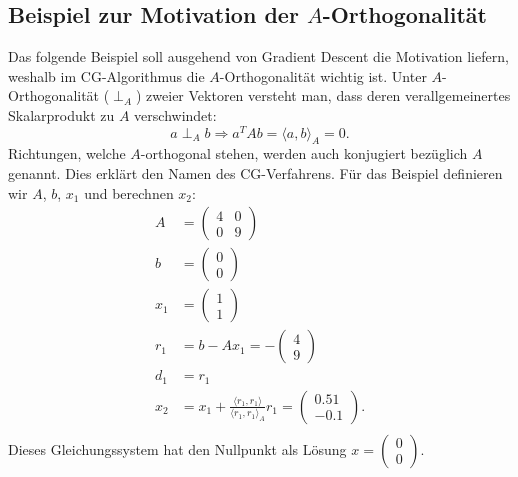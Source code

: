 \subsection{Beispiel zur Motivation der $A$-Orthogonalität} \label{cg:subsec:aortho}
%
Das folgende Beispiel soll ausgehend von Gradient Descent die Motivation liefern, weshalb im CG-Algorithmus die $A$-Orthogonalität wichtig ist.
Unter $A$-Orthogonalität ($\perp_A$) zweier Vektoren versteht man, dass deren verallgemeinertes Skalarprodukt zu $A$ verschwindet:
\begin{equation}
	a \perp_A b \Longrightarrow a^T A b = \langle a , b \rangle_A = 0.
\end{equation}
Richtungen, welche $A$-orthogonal stehen, werden auch konjugiert bezüglich $A$ genannt.
%
Dies erklärt den Namen des CG-Verfahrens.
Für das Beispiel definieren wir $A$, $b$, $x_1$ und berechnen $x_2$:
\begin{align}\nonumber
	A 	&= 		\begin{pmatrix}
				4 & 0\\
				0 & 9 
				\end{pmatrix} \nonumber\\
	b 	&= 		\begin{pmatrix}
				0\\
				0
				\end{pmatrix} \nonumber\\
	x_1 &= 		\begin{pmatrix}
				1\\
				1
				\end{pmatrix} \nonumber\\
	r_1	&= 		b - A x_1 = - 	\begin{pmatrix}
								4\\
								9
								\end{pmatrix} \nonumber\\
	d_1 &= r_1 \nonumber\\
	x_2 &= x_1 + \frac{\langle r_1 , r_1 \rangle}{\langle r_1 , r_1 \rangle_A} r_1 = 	\begin{pmatrix}
																						0.51\\
																						-0.1
																						\end{pmatrix}. \\
\end{align}
Dieses Gleichungssystem hat den Nullpunkt als Lösung $x = \begin{pmatrix}0\\0\end{pmatrix}$.
